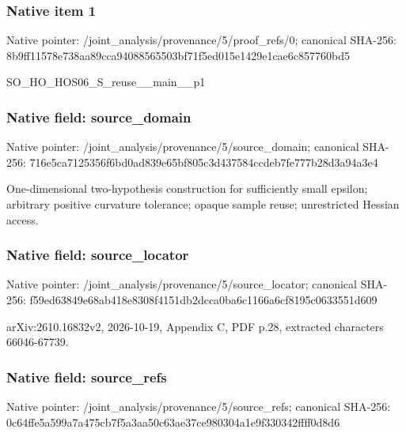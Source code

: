 \documentclass[10pt,a4paper]{article}
\begin{document}
\subsubsection{Native item 1}
Native pointer: /joint\_\allowbreak{}analysis/provenance/5/proof\_\allowbreak{}refs/0; canonical SHA-256: 8b9ff11578e738aa89cca94088565503bf71f5ed015e1429e1cae6c857760bd5

\begingroup\raggedright\sloppy SO\_\allowbreak{}HO\_\allowbreak{}HOS06\_\allowbreak{}S\_\allowbreak{}reuse\_\allowbreak{}\_\allowbreak{}main\_\allowbreak{}\_\allowbreak{}p1\par\endgroup

\subsubsection{Native field: source\_\allowbreak{}domain}
Native pointer: /joint\_\allowbreak{}analysis/provenance/5/source\_\allowbreak{}domain; canonical SHA-256: 716e5ca7125356f6bd0ad839e65bf805c3d437584ccdeb7fe777b28d3a94a3e4

\begingroup\raggedright\sloppy One-dimensional two-hypothesis construction for sufficiently small epsilon;\allowbreak{} arbitrary positive curvature tolerance;\allowbreak{} opaque sample reuse;\allowbreak{} unrestricted Hessian access.\par\endgroup

\subsubsection{Native field: source\_\allowbreak{}locator}
Native pointer: /joint\_\allowbreak{}analysis/provenance/5/source\_\allowbreak{}locator; canonical SHA-256: f59ed63849e68ab418e8308f4151db2dcca0ba6c1166a6cf8195c0633551d609

\begingroup\raggedright\sloppy arXiv:\allowbreak{}2610.16832v2,\allowbreak{} 2026-10-19,\allowbreak{} Appendix C,\allowbreak{} PDF p.28,\allowbreak{} extracted characters 66046-67739.\par\endgroup

\subsubsection{Native field: source\_\allowbreak{}refs}
Native pointer: /joint\_\allowbreak{}analysis/provenance/5/source\_\allowbreak{}refs; canonical SHA-256: 0c64ffe5a599a7a475cb7f5a3aa50c63ae37ce980304a1e9f330342ffff0d8d6
\end{document}
